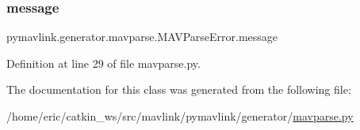 \subsubsection{\texorpdfstring{message}{message}}
{\footnotesize\ttfamily pymavlink.\+generator.\+mavparse.\+M\+A\+V\+Parse\+Error.\+message}



Definition at line 29 of file mavparse.\+py.



The documentation for this class was generated from the following file\+:\begin{DoxyCompactItemize}
\item 
/home/eric/catkin\+\_\+ws/src/mavlink/pymavlink/generator/\mbox{\hyperlink{mavparse_8py}{mavparse.\+py}}\end{DoxyCompactItemize}
